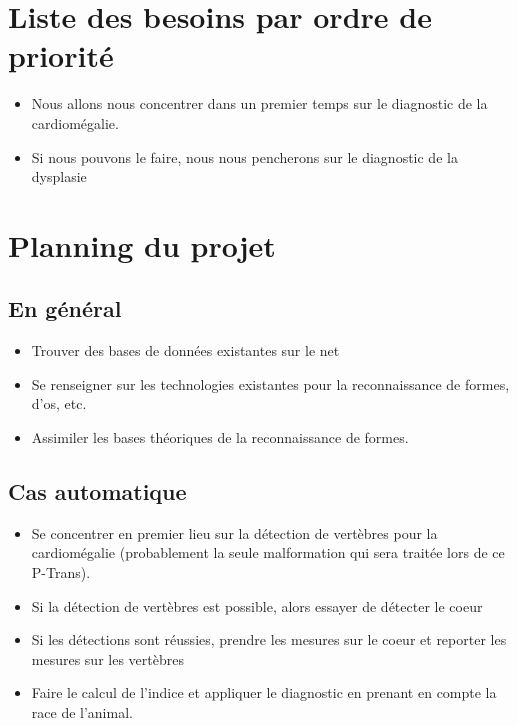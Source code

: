 \documentclass[a4paper, 11pt]{report}
\begin{document}
\section*{Liste des besoins par ordre de priorité}
\begin{itemize}
\item Nous allons nous concentrer dans un premier temps sur le diagnostic de la cardiomégalie.
\item Si nous pouvons le faire, nous nous pencherons sur le diagnostic de la dysplasie
\end{itemize}


\section*{Planning du projet}
\subsection*{En général}
\begin{itemize}
	\item Trouver des bases de données existantes sur le net
	\item Se renseigner sur les technologies existantes pour la reconnaissance de formes, d'os, etc.
	\item Assimiler les bases théoriques de la reconnaissance de formes.
\end{itemize}


\subsection*{Cas automatique}
\begin{itemize}
	\item Se concentrer en premier lieu sur la détection de vertèbres pour la cardiomégalie (probablement la seule malformation qui sera traitée lors de ce P-Trans).
	\item Si la détection de vertèbres est possible, alors essayer de détecter le coeur
	\item Si les détections sont réussies, prendre les mesures sur le coeur et reporter les mesures sur les vertèbres 
	\item Faire le calcul de l'indice et appliquer le diagnostic en prenant en compte la race de l'animal. 
\end{itemize}
\end{document}
